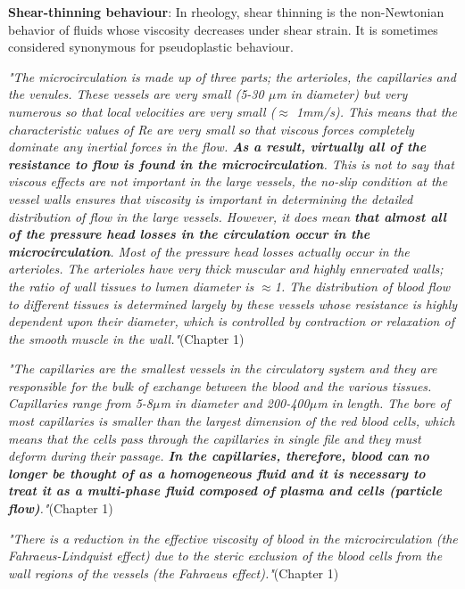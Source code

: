 \documentclass[11pt,letterpaper]{article}
\begin{document}
\textbf{Shear-thinning behaviour}: In rheology, shear thinning is the non-Newtonian behavior of fluids whose viscosity decreases under shear strain. It is sometimes considered synonymous for pseudoplastic behaviour.

\textit{"The microcirculation is made up of three parts; the arterioles, the capillaries and the venules. These vessels are very small (5-30 $\mu$m in diameter) but very numerous so that local velocities are very small ($\approx$ 1mm/s). This means that the characteristic values of Re are very small so that viscous forces completely dominate any inertial forces in the flow. \textbf{As a result, virtually all of the resistance to flow is found in the microcirculation}. This is not to say that viscous effects are not important in the large vessels, the no-slip condition at the vessel walls ensures that viscosity is important in determining the detailed distribution of flow in the large vessels. However, it does mean  \textbf{that almost all of the pressure head losses in the circulation occur in the microcirculation}. Most of the pressure head losses actually occur in the arterioles. The arterioles have very thick muscular and highly ennervated walls; the ratio of wall tissues to lumen diameter is $\approx$1. The distribution of blood flow to different tissues is determined largely by these vessels whose resistance is highly dependent upon their diameter, which is controlled by contraction or relaxation of the smooth muscle in the wall."}(Chapter 1)

\textit{"The capillaries are the smallest vessels in the circulatory system and they are responsible for the bulk of exchange between the blood and the various tissues. Capillaries range from 5-8$\mu$m in diameter and 200-400$\mu$m in length. The bore of most capillaries is smaller than the largest dimension of the red blood cells, which means that the cells pass through the capillaries in single file and they must deform during their passage. \textbf{In the capillaries, therefore, blood can no longer be thought of as a homogeneous fluid and it is necessary to treat it as a multi-phase fluid composed of plasma and cells (particle flow)}."}(Chapter 1)

\textit{"There is a reduction in the effective viscosity of blood in the microcirculation (the Fahraeus-Lindquist effect) due to the steric exclusion of the blood cells from the wall regions of the vessels (the Fahraeus effect)."}(Chapter 1)
\end{document}
